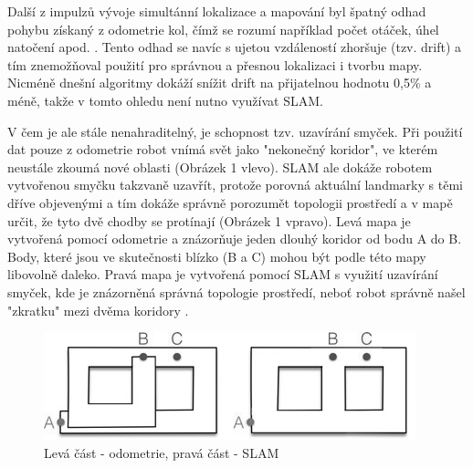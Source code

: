 \documentclass[12pt,a4paper]{report}
\begin{document}
Další z impulzů vývoje simultánní lokalizace a mapování byl špatný odhad pohybu získaný z odometrie kol, čímž se rozumí například počet otáček, úhel natočení apod. \cite{Past_Present_and_Future_of_Simultaneous_Localization_And_Mapping}. Tento odhad se navíc s ujetou vzdáleností zhoršuje (tzv. drift) a tím znemožňoval použití pro správnou a přesnou lokalizaci i tvorbu mapy. Nicméně dnešní algoritmy dokáží snížit drift na přijatelnou hodnotu 0,5\% a méně, takže v tomto ohledu není nutno využívat SLAM. 

V čem je ale stále nenahraditelný, je schopnost tzv. uzavírání smyček. Při použití dat pouze z odometrie robot vnímá svět jako "nekonečný koridor", ve kterém neustále zkoumá nové oblasti (Obrázek 1 vlevo). SLAM ale dokáže robotem vytvořenou smyčku takzvaně uzavřít, protože porovná aktuální landmarky s těmi dříve objevenými a tím dokáže správně porozumět topologii prostředí a v mapě určit, že tyto dvě chodby se protínají (Obrázek 1 vpravo). Levá mapa je vytvořená pomocí odometrie a znázorňuje jeden dlouhý koridor od bodu A do B. Body, které jsou ve skutečnosti blízko (B a C) mohou být podle této mapy libovolně daleko. Pravá mapa je vytvořená pomocí SLAM s využití uzavírání smyček, kde je znázorněná správná topologie prostředí, neboť robot správně našel "zkratku" mezi dvěma koridory \cite{Past_Present_and_Future_of_Simultaneous_Localization_And_Mapping}.

\begin{figure}[H]
\centering
\includegraphics[scale=1]{img/Obr1_b} 
\caption{Levá část - odometrie, pravá část - SLAM} 
\end{figure}
\end{document}
